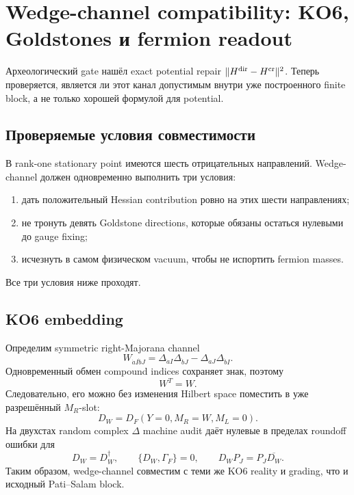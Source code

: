 \chapter{Wedge-channel compatibility: KO6, Goldstones и fermion readout}

Археологический gate нашёл exact potential repair
\(\|H^{\rm dir}-H^{\rm cr}\|^2\). Теперь проверяется, является ли этот
канал допустимым внутри уже построенного finite block, а не только хорошей
формулой для potential.

\section{Проверяемые условия совместимости}

В rank-one stationary point имеются шесть отрицательных направлений.
Wedge-channel должен одновременно выполнить три условия:
\begin{enumerate}
 \item дать положительный Hessian contribution ровно на этих шести
 направлениях;
 \item не тронуть девять Goldstone directions, которые обязаны остаться
 нулевыми до gauge fixing;
 \item исчезнуть в самом физическом vacuum, чтобы не испортить fermion masses.
\end{enumerate}
Все три условия ниже проходят.

\section{KO6 embedding}

Определим symmetric right-Majorana channel
\begin{equation}
 W_{\dot aI\dot bJ}
 =\Delta_{\dot aI}\Delta_{\dot bJ}
 -\Delta_{\dot aJ}\Delta_{\dot bI}.
 \label{eq:ps-wedge-channel}
\end{equation}
Одновременный обмен compound indices сохраняет знак, поэтому
\begin{equation}
 W^T=W.
\end{equation}
Следовательно, его можно без изменения Hilbert space поместить в уже
разрешённый \(M_R\)-slot:
\begin{equation}
 D_W=D_F(Y=0,M_R=W,M_L=0).
\end{equation}
На двухстах random complex \(\Delta\) machine audit даёт нулевые в пределах
roundoff ошибки для
\begin{equation}
 D_W=D_W^\dagger,
 \qquad
 \{D_W,\Gamma_F\}=0,
 \qquad
 D_WP_J=P_J\overline{D_W}.
\end{equation}
Таким образом, wedge-channel совместим с теми же KO6 reality и grading, что
и исходный Pati--Salam block.

